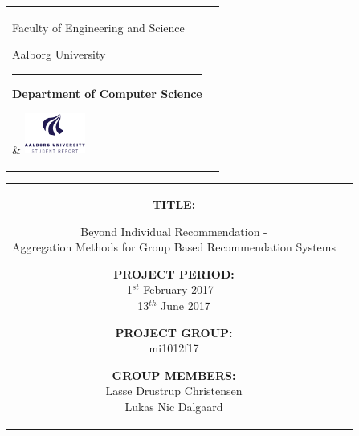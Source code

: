 \begin{titlepage}
\thispagestyle{empty}

\begin{nopagebreak}
{\samepage

\begin{tabular}{lr}
        \parbox{14.5cm}{
          {\LARGE Faculty of Engineering and Science}

          {\small Aalborg University}
          \vspace{-0.3cm}\\
        \hrule
        \vspace{0.2cm}
          {\bf Department of Computer Science}
         }   & \hspace{-2.0cm} \includegraphics[width=2cm]{graphics/aau_logo_en}
\end{tabular}

\begin{tabular}{cc}
\parbox{7cm}{
\hspace{2cm}
\begin{description}

\item {\bf TITLE:}

\noindent Beyond Individual Recommendation - \\
Aggregation Methods for Group Based Recommendation Systems


\end{description}

\parbox{8cm}{

\begin{description}
        \item {\bf PROJECT PERIOD:}\\
          1$^{st}$ February 2017 -\\ 13$^{th}$ June 2017\\
          \hspace{4cm}
        \item {\bf PROJECT GROUP:}\\
          mi1012f17\\
          \hspace{4cm}
        \item {\bf GROUP MEMBERS:}\\
          Lasse Drustrup Christensen \\
          Lukas Nic Dalgaard 
          \hspace{2cm}
          

\end{description}}}
\end{tabular}}
\end{nopagebreak}
\end{titlepage}
